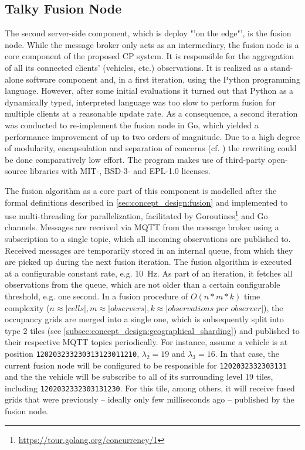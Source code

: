 \subsection{Talky Fusion Node}
\label{subsec:implementation:edge_side_fusion_node}
The second server-side component, which is deploy "'on the edge"', is the fusion node. While the message broker only acts as an intermediary, the fusion node is a core component of the proposed CP system. It is responsible for the aggregation of all its connected clients' (vehicles, etc.) observations. It is realized as a stand-alone software component and, in a first iteration, using the Python programming language. However, after some initial evaluations it turned out that Python as a dynamically typed, interpreted language was too slow to perform fusion for multiple clients at a reasonable update rate. As a consequence, a second iteration was conducted to re-implement the fusion node in Go, which yielded a performance improvement of up to two orders of magnitude. Due to a high degree of modularity, encapsulation and separation of concerns (cf. \cite{Martin2017}) the rewriting could be done comparatively low effort. The program makes use of third-party open-source libraries  with MIT-, BSD-3- and EPL-1.0 licenses.
\par
\bigskip

The fusion algorithm as a core part of this component is modelled after the formal definitions described in \cref{sec:concept_design:fusion} and implemented to use multi-threading for parallelization, facilitated by Goroutines\footnote{\url{https://tour.golang.org/concurrency/1}} and Go channels. Messages are received via MQTT from the message broker using a subscription to a single topic, which all incoming observations are published to. Received messages are temporarily stored in an internal queue, from which they are picked up during the next fusion iteration. The fusion algorithm is executed at a configurable constant rate, e.g. \SI{10}{\hertz}. As part of an iteration, it fetches all observations from the queue, which are not older than a certain configurable threshold, e.g. one second. In a fusion procedure of $O(n*m*k)$ time complexity ($n \approx |\textit{cells}|, m \approx |\textit{observers}|, k \approx |\textit{observations per observer}|$), the occupancy grids are merged into a single one, which is subsequently split into type 2 tiles (see \cref{subsec:concept_design:geographical_sharding}) and published to their respective MQTT topics periodically. For instance, assume a vehicle is at position \texttt{120203233230313123011210}, $\lambda_2 = 19$ and $\lambda_3 = 16$. In that case, the current fusion node will be configured to be responsible for \texttt{1202032332303131} and the the vehicle will be subscribe to all of its surrounding level 19 tiles, including \texttt{1202032332303131230}. For this tile, among others, it will receive fused grids that were previously – ideally only few milliseconds ago – published by the fusion node.
\par
\bigskip

